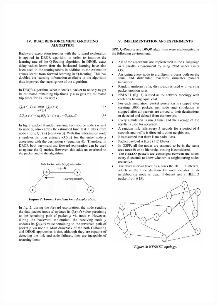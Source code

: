 \documentclass{standalone}
\begin{document}
\begin{figure}[H]
    \centering
    \includegraphics[width=14.5cm]{pic/translate/page-3.pdf}
\end{figure}
\end{document}
